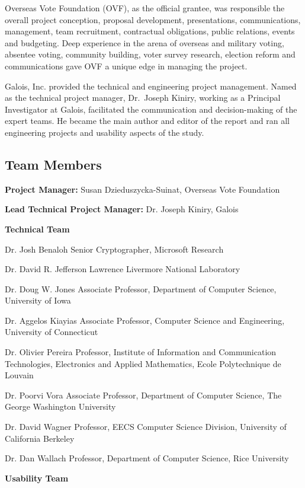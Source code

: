 Overseas Vote Foundation (OVF), as the official grantee, was
responsible the overall project conception, proposal development,
presentations, communications, management, team recruitment,
contractual obligations, public relations, events and budgeting. Deep
experience in the arena of overseas and military voting, absentee
voting, community building, voter survey research, election reform and
communications gave OVF a unique edge in managing the project.

Galois, Inc. provided the technical and engineering project
management. Named as the technical project manager, Dr.~Joseph Kiniry,
working as a Principal Investigator at Galois, facilitated the
communication and decision-making of the expert teams. He became the
main author and editor of the report and ran all engineering projects
and usability aspects of the study.

\subsection{Team Members}
\label{sec:team-members}

\textbf{Project Manager:} Susan Dzieduszycka-Suinat, Overseas Vote Foundation

\textbf{Lead Technical Project Manager:} Dr. Joseph Kiniry, Galois

\textbf{Technical Team}

Dr. Josh Benaloh
Senior Cryptographer, Microsoft Research
 
Dr. David R. Jefferson
Lawrence Livermore National Laboratory
 
Dr. Doug W. Jones
Associate Professor, Department of Computer Science, University of Iowa
 
Dr. Aggelos Kiayias
Associate Professor, Computer Science and Engineering, University of Connecticut
 
Dr. Olivier Pereira
Professor, Institute of Information and Communication Technologies, Electronics and Applied Mathematics, Ecole Polytechnique de Louvain
 
Dr. Poorvi Vora
Associate Professor, Department of Computer Science, The George Washington University
 
Dr. David Wagner
Professor, EECS Computer Science Division, University of California Berkeley
 
Dr. Dan Wallach
Professor, Department of Computer Science, Rice University
 
\textbf{Usability Team}

